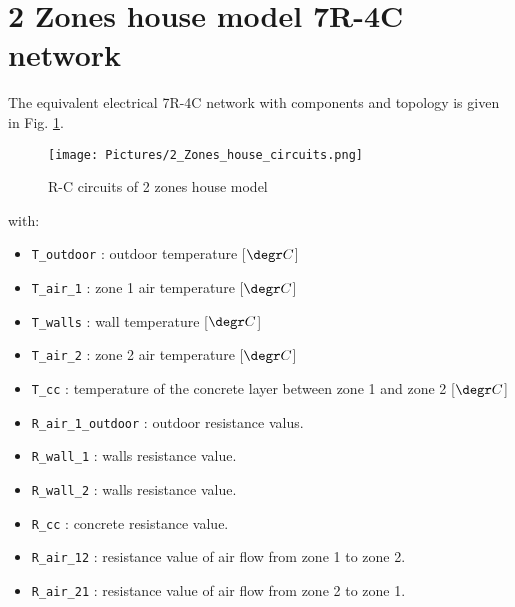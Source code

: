 \section{2 Zones house model 7R-4C network} 
	
The equivalent electrical 7R-4C network with components and topology is given in Fig. \ref{fig:eq7R4C}.

\begin{figure}[H]
	\centering
	\texttt{[image: Pictures/2\_Zones\_house\_circuits.png]}
	\caption[Short title]{R-C circuits of 2 zones house model}
	\label{fig:eq7R4C}
	\end{figure}

with:\\
\begin{itemize}
    \item \texttt{T\_outdoor} : outdoor temperature [$\degr C$] 
    \item \texttt{T\_air\_1}  : zone 1 air temperature [$\degr C$]
    \item \texttt{T\_walls}   : wall temperature [$\degr C$]
    \item \texttt{T\_air\_2}  : zone 2 air temperature [$\degr C$]
    \item \texttt{T\_cc}      : temperature of the concrete layer between zone 1 and zone 2 [$\degr C$]
    \item \texttt{R\_air\_1\_outdoor} : outdoor resistance valus.
    \item \texttt{R\_wall\_1} : walls resistance value.
    \item \texttt{R\_wall\_2} : walls resistance value.
    \item \texttt{R\_cc}      : concrete resistance value.
    \item \texttt{R\_air\_12} : resistance value of air flow from zone 1 to zone 2.
    \item \texttt{R\_air\_21} : resistance value of air flow from zone 2 to zone 1.

\end{itemize}

\newpage